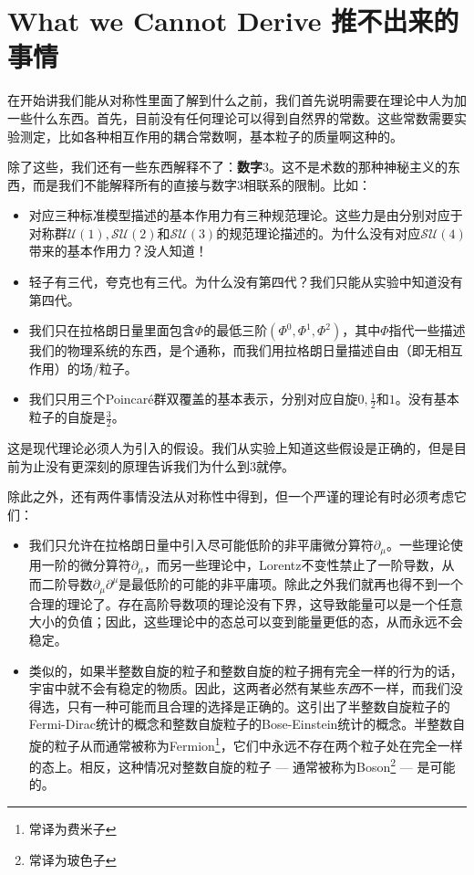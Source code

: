 \section[推不出来的事情]{What we Cannot Derive 推不出来的事情}\label{sec1.1}

在开始讲我们能从对称性里面了解到什么之前，我们首先说明需要在理论中人为加一些什么东西。首先，目前没有任何理论可以得到自然界的常数。这些常数需要实验测定，比如各种相互作用的耦合常数啊，基本粒子的质量啊这种的。

除了这些，我们还有一些东西解释不了：{\bf 数字$3$}。这不是术数的那种神秘主义的东西，而是我们不能解释所有的直接与数字$3$相联系的限制。比如：

\begin{itemize}
\item 对应三种标准模型描述的基本作用力有三种规范理论。这些力是由分别对应于对称群$\mathcal{U}(1), \mathcal{SU}(2)$和$\mathcal{SU}(3)$的规范理论描述的。为什么没有对应$\mathcal{SU}(4)$带来的基本作用力？没人知道！
\item 轻子有三代，夸克也有三代。为什么没有第四代？我们只能从实验中知道没有第四代。
\item 我们只在拉格朗日量里面包含$\Phi$的最低三阶$(\Phi^0, \Phi^1, \Phi^2)$，其中$\Phi$指代一些描述我们的物理系统的东西，是个通称，而我们用拉格朗日量描述自由（即无相互作用）的场/粒子。
\item 我们只用三个Poincar\'e群双覆盖的基本表示，分别对应自旋$0, \tfrac{1}{2}$和$1$。没有基本粒子的自旋是$\tfrac{3}{2}$。
\end{itemize}

这是现代理论必须人为引入的假设。我们从实验上知道这些假设是正确的，但是目前为止没有更深刻的原理告诉我们为什么到$3$就停。

除此之外，还有两件事情没法从对称性中得到，但一个严谨的理论有时必须考虑它们：

\begin{itemize}
\item 我们只允许在拉格朗日量中引入尽可能低阶的非平庸微分算符$\partial_\mu$。一些理论使用一阶的微分算符$\partial_\mu$，而另一些理论中，Lorentz不变性禁止了一阶导数，从而二阶导数$\partial_\mu\partial^\mu$是最低阶的可能的非平庸项。除此之外我们就再也得不到一个合理的理论了。存在高阶导数项的理论没有下界，这导致能量可以是一个任意大小的负值；因此，这些理论中的态总可以变到能量更低的态，从而永远不会稳定。
\item 类似的，如果半整数自旋的粒子和整数自旋的粒子拥有完全一样的行为的话，宇宙中就不会有稳定的物质。因此，这两者必然有某些{\it 东西}不一样，而我们没得选，只有一种可能而且合理的选择是正确的。这引出了半整数自旋粒子的Fermi-Dirac统计的概念和整数自旋粒子的Bose-Einstein统计的概念。半整数自旋的粒子从而通常被称为Fermion\footnote{常译为费米子}，它们中永远不存在两个粒子处在完全一样的态上。相反，这种情况对整数自旋的粒子 --- 通常被称为Boson\footnote{常译为玻色子} --- 是可能的。
\end{itemize}

